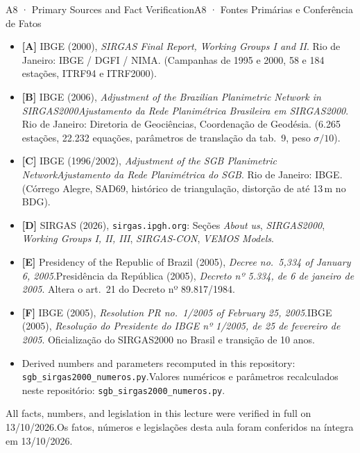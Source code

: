 \documentclass[aspectratio=169,11pt]{beamer}
\newcommand{\tr}[2]{\ifEN#2\else#1\fi}
\begin{document}
\begin{frame}{\tr{A8 · Fontes Primárias e Conferência de Fatos}{A8 · Primary Sources and Fact Verification}}
  \tiny
  \begin{itemize}
    \setlength{\itemsep}{2pt}
    \item \textbf{[A]} IBGE (\num{2000}), \emph{SIRGAS Final Report, Working Groups I and II}. Rio de Janeiro: IBGE / DGFI / NIMA. (Campanhas de 1995 e 2000, 58 e 184 estações, ITRF94 e ITRF2000).
    \item \textbf{[B]} IBGE (\num{2006}), \emph{\tr{Ajustamento da Rede Planimétrica Brasileira em SIRGAS2000}{Adjustment of the Brazilian Planimetric Network in SIRGAS2000}}. Rio de Janeiro: Diretoria de Geociências, Coordenação de Geodésia. (6.265 estações, 22.232 equações, parâmetros de translação da tab.\ 9, peso $\sigma/10$).
    \item \textbf{[C]} IBGE (\num{1996}/\num{2002}), \emph{\tr{Ajustamento da Rede Planimétrica do SGB}{Adjustment of the SGB Planimetric Network}}. Rio de Janeiro: IBGE. (Córrego Alegre, SAD69, histórico de triangulação, distorção de até \num{13}\,m no BDG).
    \item \textbf{[D]} SIRGAS (\num{2026}), \texttt{sirgas.ipgh.org}: Seções \emph{About us}, \emph{SIRGAS2000}, \emph{Working Groups I, II, III}, \emph{SIRGAS-CON}, \emph{VEMOS Models}.
    \item \textbf{[E]} \tr{Presidência da República (\num{2005}), \emph{Decreto nº 5.334, de 6 de janeiro de 2005}. Altera o art.\ 21 do Decreto nº 89.817/1984.}{Presidency of the Republic of Brazil (\num{2005}), \emph{Decree no.\ 5,334 of January 6, 2005}.}
    \item \textbf{[F]} \tr{IBGE (\num{2005}), \emph{Resolução do Presidente do IBGE nº 1/2005, de 25 de fevereiro de 2005}. Oficialização do SIRGAS2000 no Brasil e transição de 10 anos.}{IBGE (\num{2005}), \emph{Resolution PR no.\ 1/2005 of February 25, 2005}.}
    \item \tr{Valores numéricos e parâmetros recalculados neste repositório: \texttt{sgb\_sirgas2000\_numeros.py}.}{Derived numbers and parameters recomputed in this repository: \texttt{sgb\_sirgas2000\_numeros.py}.}
  \end{itemize}
  \medskip
  \normalsize
  \centering
  \tr{Os fatos, números e legislações desta aula foram conferidos na íntegra em 13/10/2026.}{All facts, numbers, and legislation in this lecture were verified in full on 13/10/2026.}
\end{frame}
\end{document}
